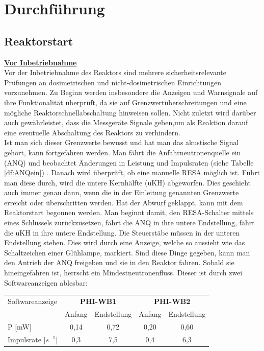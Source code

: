 \section{Durchführung}
    \subsection{Reaktorstart}
    \underline{\textbf{Vor Inbetriebnahme}}  \\ 
    Vor der Inbetriebnahme des Reaktors sind mehrere sicherheitsrelevante Prüfungen an dosimetrischen und nicht-dosimetrischen Einrichtungen vorzunehmen. Zu Beginn werden insbesondere die Anzeigen und Warnsignale auf ihre Funktionalität überprüft, da sie auf Grenzwertüberschreitungen und eine mögliche Reaktorschnellabschaltung hinweisen sollen. Nicht zuletzt wird darüber auch gewährleistet, dass die Messgeräte Signale geben,um als Reaktion darauf eine eventuelle Abschaltung des Reaktors zu verhindern.\\
    Ist man sich dieser Grenzwerte bewusst und hat man das akustische Signal gehört, kann fortgefahren werden. Man fährt die Anfahrneutronenquelle ein (ANQ) und beobachtet Änderungen in Leistung und Impulsraten (siehe Tabelle \ref{df:ANQein}) . Danach wird überprüft, ob eine manuelle RESA möglich ist. Führt man diese durch, wird die untere Kernhälfte (uKH) abgeworfen. Dies geschieht auch immer genau dann, wenn die in der Einleitung genannten Grenzwerte erreicht oder überschritten werden. 
    Hat der Abwurf geklappt, kann mit dem Reaktorstart begonnen werden. Man beginnt damit, den RESA-Schalter mittels eines Schlüssels zurückzusetzen, fährt die ANQ in ihre untere Endstellung, fährt die uKH in ihre untere Endstellung. Die Steuerstäbe müssen in der unteren Endstellung stehen. Dies wird durch eine Anzeige, welche so aussieht wie das Schaltzeichen einer Glühlampe, markiert.
    Sind diese Dinge gegeben, kann man den Antrieb der ANQ freigeben und sie in den Reaktor fahren. Sobald sie hineingefahren ist, herrscht ein Mindestneutronenfluss. Dieser ist durch zwei Softwareanzeigen ablesbar: 
    \begin{center}
    \begin{tabular}{l|c|c|c|c}
             Softwareanzeige  & \multicolumn{2}{c|}{\textbf{PHI-WB1}} & \multicolumn{2}{c}{\textbf{PHI-WB2}}\\
                              & Anfang & Endstellung & Anfang & Endstellung \\ 
       \hline           P [mW]& 0,14   & 0,72        & 0,20   & 0,60        \\
         Impulsrate [$s^{-1}$]& 0,3    & 7,5         & 0,4    & 6,3         
    \end{tabular}
    \label{df:ANQein}
    \end{center}
